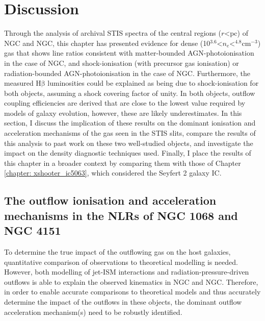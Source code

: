 \newpage
\section{Discussion}
\label{section: stis_seyferts: discussion}

Through the analysis of archival STIS spectra of the central regions ($r$\;\textless{}\;pc) of NGC and NGC, this chapter has presented evidence for dense (10$^{3.6}$\;\textless\;$n_e$\;\textless{}$^{4.8}$\;cm$^{-3}$) gas that shows line ratios consistent with matter-bounded AGN-photoionisation in the case of NGC, and shock-ionisation (with precursor gas ionisation) or radiation-bounded AGN-photoionisation in the case of NGC. Furthermore, the measured H$\mathrm{\beta}$ luminosities could be explained as being due to shock-ionisation for both objects, assuming a shock covering factor of unity. In both objects, outflow coupling efficiencies are derived that are close to the lowest value required by models of galaxy evolution, however, these are likely underestimates. In this section, I discuss the implication of these results on the dominant ionisation and acceleration mechanisms of the gas seen in the STIS slits, compare the results of this analysis to past work on these two well-studied objects, and investigate the impact on the density diagnostic techniques used. Finally, I place the results of this chapter in a broader context by comparing them with those of Chapter \ref{chapter: xshooter_ic5063}, which considered the Seyfert 2 galaxy IC.

\subsection{The outflow ionisation and acceleration mechanisms in the NLRs of NGC 1068 and NGC 4151}
\label{section: stis_seyferts: disc-ionisation}

To determine the true impact of the outflowing gas on the host galaxies, quantitative comparison of observations to theoretical modelling is needed. However, both modelling of jet-ISM interactions  \citep{Capetti1997, Axon1998, May2017, May2020} and radiation-pressure-driven outflows \citep{Crenshaw2000_N4151, Crenshaw2000_N1068, Das2005, Das2006, Revalski2021, Meena2023} is able to explain the observed kinematics in NGC and NGC. Therefore, in order to enable accurate comparisons to theoretical models and thus accurately determine the impact of the outflows in these objects, the dominant outflow acceleration mechanism(s) need to be robustly identified.


